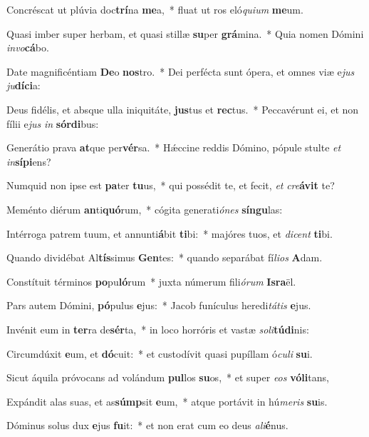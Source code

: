 \item Concréscat ut plúvia doc\textbf{trí}na \textbf{me}a,~* fluat ut ros eló\textit{qui}\textit{um} \textbf{me}um.
\item Quasi imber super herbam, et quasi stillæ \textbf{su}per \textbf{grá}mina.~* Quia nomen Dómini \textit{in}\textit{vo}\textbf{cá}bo.
\item Date magnificéntiam \textbf{De}o \textbf{nos}tro.~* Dei perfécta sunt ópera, et omnes viæ e\textit{jus} \textit{ju}\textbf{dí}\textbf{ci}a:
\item Deus fidélis, et absque ulla iniquitáte, \textbf{jus}tus et \textbf{rec}tus.~* Peccavérunt ei, et non fílii e\textit{jus} \textit{in} \textbf{sór}\textbf{di}bus:
\item Generátio prava \textbf{at}que per\textbf{vér}sa.~* Hǽccine reddis Dómino, pópule stulte \textit{et} \textit{in}\textbf{sí}\textbf{pi}ens?
\item Numquid non ipse est \textbf{pa}ter \textbf{tu}us,~* qui possédit te, et fecit, \textit{et} \textit{cre}\textbf{á}\textbf{vit} te?
\item Meménto diérum \textbf{an}ti\textbf{quó}rum,~* cógita generati\textit{ó}\textit{nes} \textbf{sín}\textbf{gu}las:
\item Intérroga patrem tuum, et annunti\textbf{á}bit \textbf{ti}bi:~* majóres tuos, et \textit{di}\textit{cent} \textbf{ti}bi.
\item Quando dividébat Al\textbf{tís}simus \textbf{Gen}tes:~* quando separábat fí\textit{li}\textit{os} \textbf{A}dam.
\item Constítuit términos \textbf{po}pu\textbf{ló}rum~* juxta númerum fili\textit{ó}\textit{rum} \textbf{Is}\textbf{ra}ël.
\item Pars autem Dómini, \textbf{pó}pulus \textbf{e}jus:~* Jacob funículus heredi\textit{tá}\textit{tis} \textbf{e}jus.
\item Invénit eum in \textbf{ter}ra de\textbf{sér}ta,~* in loco horróris et vastæ \textit{so}\textit{li}\textbf{tú}\textbf{di}nis:
\item Circumdúxit \textbf{e}um, et \textbf{dó}cuit:~* et custodívit quasi pupíllam ó\textit{cu}\textit{li} \textbf{su}i.
\item Sicut áquila próvocans ad volándum \textbf{pul}los \textbf{su}os,~* et super \textit{e}\textit{os} \textbf{vó}\textbf{li}tans,
\item Expándit alas suas, et as\textbf{súmp}sit \textbf{e}um,~* atque portávit in hú\textit{me}\textit{ris} \textbf{su}is.
\item Dóminus solus dux \textbf{e}jus \textbf{fu}it:~* et non erat cum eo deus \textit{a}\textit{li}\textbf{é}nus.
